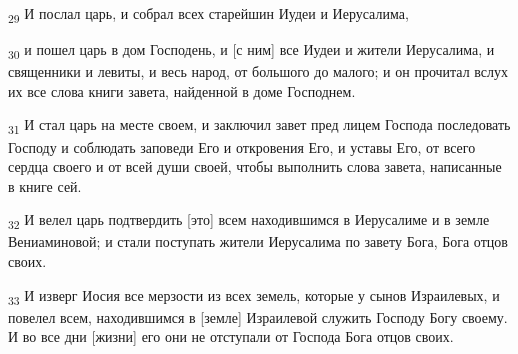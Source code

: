 \begin{tcolorbox}
\textsubscript{29} И послал царь, и собрал всех старейшин Иудеи и Иерусалима,
\end{tcolorbox}
\begin{tcolorbox}
\textsubscript{30} и пошел царь в дом Господень, и [с ним] все Иудеи и жители Иерусалима, и священники и левиты, и весь народ, от большого до малого; и он прочитал вслух их все слова книги завета, найденной в доме Господнем.
\end{tcolorbox}
\begin{tcolorbox}
\textsubscript{31} И стал царь на месте своем, и заключил завет пред лицем Господа последовать Господу и соблюдать заповеди Его и откровения Его, и уставы Его, от всего сердца своего и от всей души своей, чтобы выполнить слова завета, написанные в книге сей.
\end{tcolorbox}
\begin{tcolorbox}
\textsubscript{32} И велел царь подтвердить [это] всем находившимся в Иерусалиме и в земле Вениаминовой; и стали поступать жители Иерусалима по завету Бога, Бога отцов своих.
\end{tcolorbox}
\begin{tcolorbox}
\textsubscript{33} И изверг Иосия все мерзости из всех земель, которые у сынов Израилевых, и повелел всем, находившимся в [земле] Израилевой служить Господу Богу своему. И во все дни [жизни] его они не отступали от Господа Бога отцов своих.
\end{tcolorbox}
